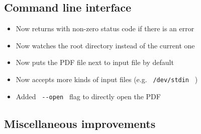 \subsection{Command line interface}\label{command-line-interface}

\begin{itemize}
\tightlist
\item
  Now returns with non-zero status code if there is an error
\item
  Now watches the root directory instead of the current one
\item
  Now puts the PDF file next to input file by default
\item
  Now accepts more kinds of input files (e.g. \texttt{\ /dev/stdin\ } )
\item
  Added \texttt{\ -\/-open\ } flag to directly open the PDF
\end{itemize}

\subsection{Miscellaneous
improvements}\label{miscellaneous-improvements}

